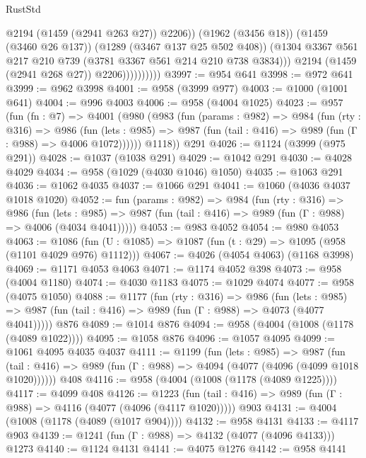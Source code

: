 \begin{lexlean}{RustStd}
\begin{coremodule}
                              @2194
                              (@1459 (@2941 @263 @27))
                              @2206))
                          (@1962 (@3456 @18))
                          (@1459 (@3460 @26 @137))
                          (@1289 (@3467 @137 @25 @502 @408))
                          (@1304 @3367 @561 @217 @210 @739 (@3781 @3367 @561 @214 @210 @738 @3834)))
                        @2194
                        (@1459 (@2941 @268 @27))
                        @2206))))))))))
@3997 := @954 @641
@3998 := @972 @641
@3999 := @962 @3998
@4001 := @958 (@3999 @977)
@4003 := @1000 (@1001 @641)
@4004 := @996 @4003
@4006 := @958 (@4004 @1025)
@4023 := @957
    (fun (fn : @7) =>
    @4001
      (@980
        (@983
          (fun (params : @982) =>
          @984
            (fun (rty : @316) =>
            @986
              (fun (lets : @985) =>
              @987 (fun (tail : @416) => @989 (fun (Γ : @988) => @4006 @1072))))))
        @1118))
    @291
@4026 := @1124 (@3999 (@975 @291))
@4028 := @1037 (@1038 @291)
@4029 := @1042 @291
@4030 := @4028 @4029
@4034 := @958 (@1029 (@4030 @1046) @1050)
@4035 := @1063 @291
@4036 := @1062 @4035
@4037 := @1066 @291
@4041 := @1060 (@4036 @4037 @1018 @1020)
@4052 := fun (params : @982) =>
  @984
    (fun (rty : @316) =>
    @986
      (fun (lets : @985) =>
      @987 (fun (tail : @416) => @989 (fun (Γ : @988) => @4006 (@4034 @4041)))))
@4053 := @983 @4052
@4054 := @980 @4053
@4063 := @1086 (fun (U : @1085) => @1087 (fun (t : @29) => @1095 (@958 (@1101 @4029 @976) @1112)))
@4067 := @4026 (@4054 @4063) (@1168 @3998)
@4069 := @1171 @4053 @4063
@4071 := @1174 @4052 @398
@4073 := @958 (@4004 @1180)
@4074 := @4030 @1183
@4075 := @1029 @4074
@4077 := @958 (@4075 @1050)
@4088 := @1177
    (fun (rty : @316) =>
    @986
      (fun (lets : @985) =>
      @987 (fun (tail : @416) => @989 (fun (Γ : @988) => @4073 (@4077 @4041)))))
    @876
@4089 := @1014 @876
@4094 := @958 (@4004 (@1008 (@1178 (@4089 @1022))))
@4095 := @1058 @876
@4096 := @1057 @4095
@4099 := @1061 @4095 @4035 @4037
@4111 := @1199
    (fun (lets : @985) =>
    @987 (fun (tail : @416) => @989 (fun (Γ : @988) => @4094 (@4077 (@4096 (@4099 @1018 @1020))))))
    @408
@4116 := @958 (@4004 (@1008 (@1178 (@4089 @1225))))
@4117 := @4099 @408
@4126 := @1223
    (fun (tail : @416) => @989 (fun (Γ : @988) => @4116 (@4077 (@4096 (@4117 @1020)))))
    @903
@4131 := @4004 (@1008 (@1178 (@4089 (@1017 @904))))
@4132 := @958 @4131
@4133 := @4117 @903
@4139 := @1241 (fun (Γ : @988) => @4132 (@4077 (@4096 @4133))) @1273
@4140 := @1124 @4131
@4141 := @4075 @1276
@4142 := @958 @4141

\end{coremodule}
\end{lexlean}
